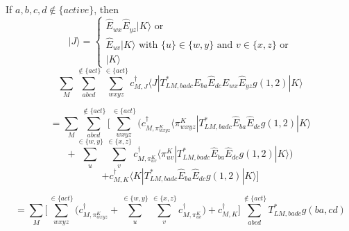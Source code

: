 \documentclass[12pt]{article}
\begin{document}
\noindent If $a,b,c,d \notin \{active\} $, then 
\begin{equation}
 |J\rangle =
\begin{cases}
 \hat{E}_{wx}\hat{E}_{yz}|K\rangle \text{\ \ \ \ or \ \ }\\
 \hat{E}_{uv}|K\rangle \text{\ \ \ \ \ \ \ with \ \ } \{u\} \in \{w,y\}\text{\ \ \ \ and \ \ } v \in \{x,z\}\text{\  \ \ or} \\
 |K\rangle
 \end{cases}
\end{equation}
\begin{equation*}
\sum_{M}  \sum_{abcd}^{\notin \{act\} } \sum_{wxyz}^{\in\{act\}} 
 c^{\dagger}_{M,J}  \langle J |T^{*}_{LM,badc}\hat{E}_{ba}\hat{E}_{dc}\hat{E}_{wx}\hat{E}_{yz}g(1,2) |K  \rangle
\end{equation*}

\begin{equation*}
= \sum_{M}  \sum_{abcd}^{\notin \{act\} } \Bigg[\sum_{wxyz}^{\in\{act\}}\Bigg( 
 c^{\dagger}_{M,\pi^{K}_{wxyz}}  \langle \pi^{K}_{wxyz}|T^{*}_{LM,badc}\hat{E}_{ba}\hat{E}_{dc}g(1,2) |K  \rangle
\end{equation*}
\begin{equation*}
+ \sum_{u}^{\in\{w,y\}} \sum_{v}^{\in\{x,z\}} 
 c^{\dagger}_{M,\pi^{K}_{uv}}  \langle \pi^{K}_{uv}|T^{*}_{LM,badc}\hat{E}_{ba}\hat{E}_{dc}g(1,2) |K  \rangle\Bigg)
\end{equation*}
\begin{equation*}
+ c^{\dagger}_{M,K}  \langle K|T^{*}_{LM,badc}\hat{E}_{ba}\hat{E}_{dc}g(1,2) |K  \rangle\Bigg]
\end{equation*}

\begin{equation*}
= \sum_{M}  \Bigg[\sum_{wxyz}^{\in\{act\}}\Bigg( 
 c^{\dagger}_{M,\pi^{K}_{wxyz}}  + \sum_{u}^{\in\{w,y\}} \sum_{v}^{\in\{x,z\}}c^{\dagger}_{M,\pi^{K}_{uv}}\Bigg) + c^{\dagger}_{M,K} \Bigg] \sum_{abcd}^{\notin \{act\} } T^{*}_{LM,badc}g(ba,cd)
\end{equation*}
\end{document}
